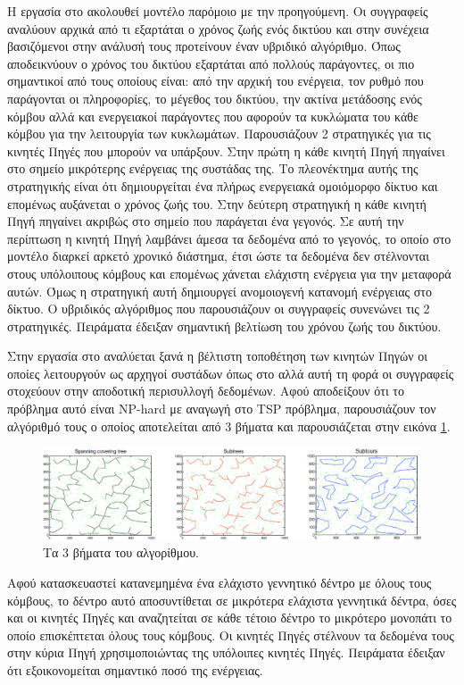 Η εργασία στο \cite{event_residual_hybrid} ακολουθεί μοντέλο παρόμοιο με την προηγούμενη. Οι συγγραφείς αναλύουν αρχικά από τι εξαρτάται ο χρόνος
ζωής ενός δικτύου και στην συνέχεια βασιζόμενοι στην ανάλυσή τους προτείνουν έναν υβριδικό αλγόριθμο. Όπως αποδεικνύουν ο χρόνος του δικτύου εξαρτάται από πολλούς
παράγοντες, οι πιο σημαντικοί από τους οποίους είναι: από την αρχική του ενέργεια, τον ρυθμό που παράγονται οι πληροφορίες, το μέγεθος του δικτύου, την ακτίνα
μετάδοσης ενός κόμβου αλλά και ενεργειακοί παράγοντες που αφορούν τα κυκλώματα του κάθε κόμβου για την λειτουργία των κυκλωμάτων. Παρουσιάζουν 2 στρατηγικές για τις
κινητές Πηγές που μπορούν να υπάρξουν. Στην πρώτη η κάθε κινητή Πηγή πηγαίνει στο σημείο μικρότερης ενέργειας της συστάδας της. Το πλεονέκτημα αυτής της στρατηγικής
είναι ότι δημιουργείται ένα πλήρως ενεργειακά ομοιόμορφο δίκτυο και επομένως αυξάνεται ο χρόνος ζωής του. Στην δεύτερη στρατηγική η κάθε κινητή Πηγή πηγαίνει ακριβώς
στο σημείο που παράγεται ένα γεγονός. Σε αυτή την περίπτωση η κινητή Πηγή λαμβάνει άμεσα τα δεδομένα από το γεγονός, το οποίο στο μοντέλο διαρκεί αρκετό χρονικό
διάστημα, έτσι ώστε τα δεδομένα δεν στέλνονται στους υπόλοιπους κόμβους και επομένως χάνεται ελάχιστη ενέργεια για την μεταφορά αυτών. Όμως η στρατηγική αυτή
δημιουργεί ανομοιογενή κατανομή ενέργειας στο δίκτυο. Ο υβριδικός αλγόριθμος που παρουσιάζουν οι συγγραφείς συνενώνει τις 2 στρατηγικές. Πειράματα έδειξαν
σημαντική βελτίωση του χρόνου ζωής του δικτύου.

Στην εργασία στο \cite{yuanyuan2} αναλύεται ξανά η βέλτιστη τοποθέτηση των κινητών Πηγών οι οποίες λειτουργούν ως αρχηγοί συστάδων όπως στο \cite{yuanyuan1} αλλά αυτή
τη φορά οι συγγραφείς στοχεύουν στην αποδοτική περισυλλογή δεδομένων. Αφού αποδείξουν ότι το πρόβλημα αυτό είναι NP-hard με αναγωγή στο TSP πρόβλημα, παρουσιάζουν τον
αλγόριθμό τους ο οποίος αποτελείται από 3 βήματα και παρουσιάζεται στην εικόνα \ref{fig:yuanyuan_mst}.
\begin{figure}[h]
	\centering
	\includegraphics[width=\textwidth]{images/yuanyuan_mst.eps}
	\caption{Τα 3 βήματα του αλγορίθμου.}
	\label{fig:yuanyuan_mst}
\end{figure}
Αφού κατασκευαστεί κατανεμημένα ένα ελάχιστο γεννητικό δέντρο με όλους τους κόμβους, το δέντρο αυτό αποσυντίθεται σε μικρότερα ελάχιστα γεννητικά δέντρα, όσες και
οι κινητές Πηγές και αναζητείται σε κάθε τέτοιο δέντρο το μικρότερο μονοπάτι το οποίο επισκέπτεται όλους τους κόμβους. Οι κινητές Πηγές στέλνουν τα δεδομένα τους
στην κύρια Πηγή χρησιμοποιώντας της υπόλοιπες κινητές Πηγές. Πειράματα έδειξαν ότι εξοικονομείται σημαντικό ποσό της ενέργειας.


